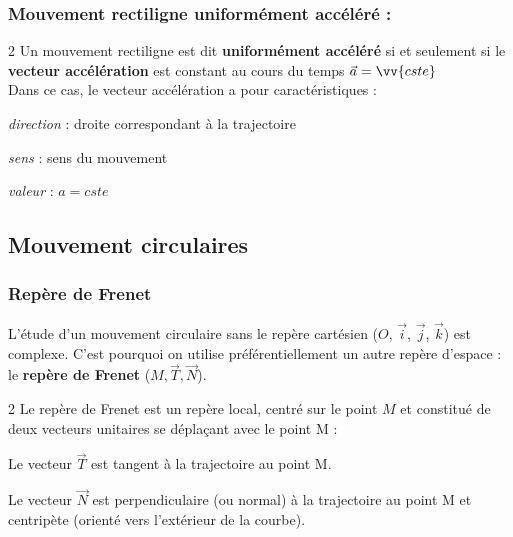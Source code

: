\documentclass[a4paper,11pt,fleqn]{article}%
\begin{document}
		\subsubsection*{Mouvement rectiligne uniformément accéléré :}
\begin{multicols}{2}
		Un mouvement rectiligne est dit \textbf{uniformément accéléré} si et seulement si le \textbf{ vecteur accélération} est constant au cours du temps  $\vec{a} = \vv{cste}$\\
		Dans ce cas, le vecteur accélération a pour caractéristiques :
		\begin{itemize*}
			\item \textit{direction} : droite correspondant à la trajectoire
			\item \textit{sens} : sens du mouvement
			\item \textit{valeur} : $a=cste$
		\end{itemize*}
\columnbreak

\noindent
{}

\end{multicols}
	\subsection{Mouvement circulaires}
		\subsubsection*{Repère de Frenet}
		L'étude d'un mouvement circulaire sans le repère cartésien ($O$, $\vec{i}$, $\vec{j}$, $\vec{k}$) est complexe. C'est pourquoi on utilise préférentiellement un autre repère d'espace : le \textbf{repère de Frenet} ($M,\vec{T}, \vec{N}$).
		\begin{multicols}{2}
		Le repère de Frenet est un repère local, centré sur le point $M$ et constitué de deux vecteurs unitaires se déplaçant avec le point M :
		\begin{itemize*}
			\item Le vecteur $\vec{T}$ est tangent à la trajectoire au point M.
			\item Le vecteur $\vec{N}$ est perpendiculaire (ou normal) à la trajectoire au point M et centripète (orienté vers l'extérieur de la courbe).
		\end{itemize*}
\columnbreak

\noindent
{}		
		\end{multicols}
\end{document}
